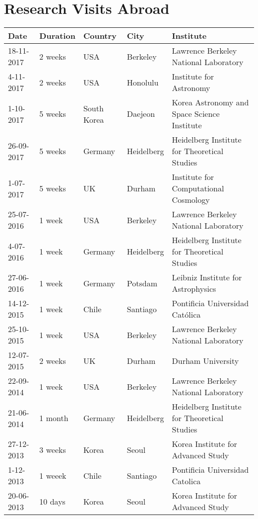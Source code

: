 \documentclass{report}
\begin{document}
\section*{Research Visits Abroad}

\begin{tabular}{p{1.7cm} p{1.3cm} p{1.5cm} p{1.5cm} p{7.0cm}}\hline
Date & Duration & Country & City & Institute\\\hline
18-11-2017 & 2 weeks & USA & Berkeley & Lawrence Berkeley National Laboratory\\
4-11-2017 & 2 weeks & USA & Honolulu & Institute for Astronomy\\
1-10-2017 & 5 weeks & South Korea & Daejeon & Korea Astronomy and Space Science Institute \\
26-09-2017 & 5 weeks & Germany & Heidelberg & Heidelberg Institute for Theoretical Studies\\
1-07-2017 & 5 weeks & UK & Durham & Institute for Computational Cosmology\\
25-07-2016 & 1 week & USA & Berkeley & Lawrence Berkeley National Laboratory\\
4-07-2016 & 1 week & Germany & Heidelberg & Heidelberg Institute for Theoretical Studies \\
27-06-2016 & 1 week & Germany & Potsdam & Leibniz Institute for Astrophysics \\
14-12-2015 & 1 week & Chile & Santiago & Pontificia Universidad Cat\'olica\\
25-10-2015 & 1 week & USA & Berkeley & Lawrence Berkeley National Laboratory\\
12-07-2015 & 2 weeks & UK & Durham & Durham University\\
22-09-2014 & 1 week & USA & Berkeley & Lawrence Berkeley National Laboratory\\ 
21-06-2014 & 1 month & Germany & Heidelberg & Heidelberg Institute for Theoretical Studies \\
27-12-2013 & 3 weeks & Korea & Seoul & Korea Institute for Advanced Study\\
1-12-2013 & 1 weeek & Chile & Santiago & Pontificia Universidad Catolica\\
20-06-2013 & 10 days & Korea & Seoul & Korea Institute for Advanced Study\\\hline
\end{tabular}
\end{document}
